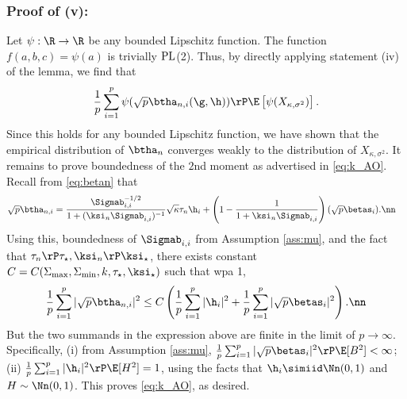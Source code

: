 
\vspace{5pt}
\subsubsection{Proof of (v):} Let $\psi:\R\rightarrow\R$ be any bounded Lipschitz function. The function $f(a,b,c) = \psi(a)$ is trivially $\rm{PL}$(2). Thus, by directly applying statement (iv) of the lemma, we find that
$$
\frac{1}{p}\sum_{i=1}^p{\psi(\sqrt{p}\btha_{n,i}(\g,\h))} \rP \E\left[\psi(X_{\kappa,\sigma^2})\right].
$$
Since this holds for any bounded Lipschitz function, we have shown that the empirical distribution of $\btha_n$ converges weakly to the distribution of $X_{\kappa,\sigma^2}$. It remains to prove boundedness of the $2$nd moment as advertised in \eqref{eq:k_AO}. Recall  from
\eqref{eq:betan} that
\begin{align}
\sqrt{p}\btha_{n,i}&=\frac{{\Sigmab_{i,i}^{-1/2}}}{1+(\ksi_n\Sigmab_{i,i})^{-1}}\sqrt{\kappa}\tau_n\h_i +\left(1-\frac{1}{1+\ksi_n\Sigmab_{i,i}}\right)(\sqrt{p}\betas_i).\nn
\end{align}
Using this, boundedness of $\Sigmab_{i,i}$ from Assumption \ref{ass:mu}, and the fact that $\tau_n\rP\tau_\star, \ksi_n\rP\ksi_\star$, there exists constant $C=C(\Sigma_{\max},\Sigma_{\min},k,\tau_\star,\ksi_\star)$ such that wpa 1,
\begin{align}
\frac{1}{p}\sum_{i=1}^p|\sqrt{p}\btha_{n,i}|^{2} \leq C\left(\frac{1}{p}\sum_{i=1}^p|\h_{i}|^{2}+\frac{1}{p}\sum_{i=1}^p|\sqrt{p}\betas_{i}|^{2}\right).\nn
\end{align}
But the two summands in the expression above are finite in the limit of $p\rightarrow\infty$. Specifically, (i) from Assumption \ref{ass:mu}, $\frac{1}{p}\sum_{i=1}^p|\sqrt{p}\betas_{i}|^{2}\rP\E[B^{2}]<\infty$; (ii) $\frac{1}{p}\sum_{i=1}^p|\h_{i}|^{2}\rP\E[H^{2}]=1$, using the facts that $\h_i\simiid\Nn(0,1)$ and $H\sim\Nn(0,1)$. This proves \eqref{eq:k_AO}, as desired.




















